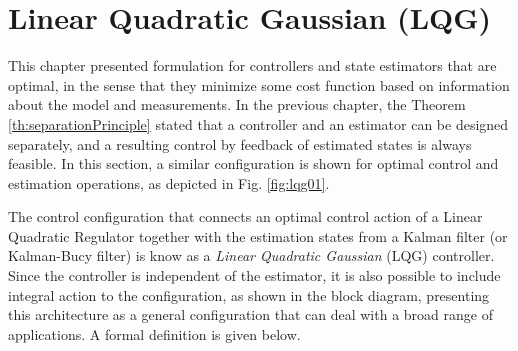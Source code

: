 \documentclass[a4paper,11pt]{book}
\numberwithin{figure}{chapter}
\numberwithin{equation}{chapter}
\numberwithin{table}{chapter}
\theoremstyle{definition}
\begin{document}
\section{Linear Quadratic Gaussian (LQG)}

This chapter presented formulation for controllers and state estimators that are optimal, in the sense that they minimize some cost function based on information about the model and measurements. In the previous chapter, the Theorem \ref{th:separationPrinciple} stated that a controller and an estimator can be designed separately, and a resulting control by feedback of estimated states is always feasible. In this section, a similar configuration is shown for optimal control and estimation operations, as depicted in Fig. \ref{fig:lqg01}. 

The control configuration that connects an optimal control action of a Linear Quadratic Regulator together with the estimation states from a Kalman filter (or Kalman-Bucy filter) is know as a \textit{Linear Quadratic Gaussian} (LQG) controller. Since the controller is independent of the estimator, it is also possible to include integral action to the configuration, as shown in the block diagram, presenting this architecture as a general configuration that can deal with a broad range of applications. A formal definition is given below.
\end{document}
